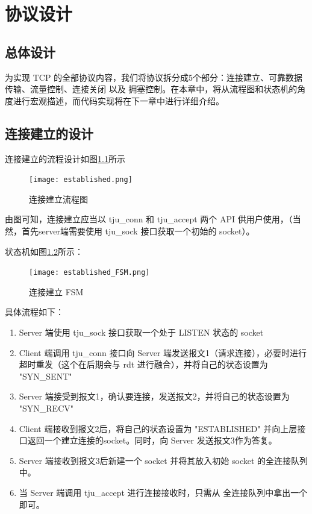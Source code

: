
\chapter{协议设计}

\section{总体设计}

为实现 TCP 的全部协议内容，我们将协议拆分成5个部分：连接建立、可靠数据传输、流量控制、连接关闭 以及 拥塞控制。在本章中，将从流程图和状态机的角度进行宏观描述，而代码实现将在下一章中进行详细介绍。

\section{连接建立的设计}

连接建立的流程设计如图\ref{fig:established}所示

\begin{figure}[!htbp]
    \centering
    \texttt{[image: established.png]}
    \label{fig:established}\caption{连接建立流程图}
\end{figure}


由图可知，连接建立应当以 tju\_conn 和 tju\_accept 两个 API 供用户使用，（当然，首先server端需要使用 tju\_sock 接口获取一个初始的 socket）。

状态机如图\ref{fig:established_FSM}所示：

\begin{figure}[!htbp]
    \centering
    \texttt{[image: established\_FSM.png]}
    \label{fig:established_FSM}\caption{连接建立 FSM}
\end{figure}

具体流程如下：
\begin{enumerate}
    \item Server 端使用 tju\_sock 接口获取一个处于 LISTEN 状态的 socket 
    \item Client 端调用 tju\_conn 接口向 Server 端发送报文1（请求连接），必要时进行超时重发（这个在后期会与 rdt 进行融合），并将自己的状态设置为 "SYN\_SENT"
    \item Server 端接受到报文1，确认要连接，发送报文2，并将自己的状态设置为 "SYN\_RECV"
    \item Client 端接收到报文2后，将自己的状态设置为 "ESTABLISHED" 并向上层接口返回一个建立连接的socket。同时，向 Server 发送报文3作为答复。
    \item Server 端接收到报文3后新建一个 socket 并将其放入初始 socket 的全连接队列中。
    \item 当 Server 端调用 tju\_accept 进行连接接收时，只需从 全连接队列中拿出一个即可。
\end{enumerate}

